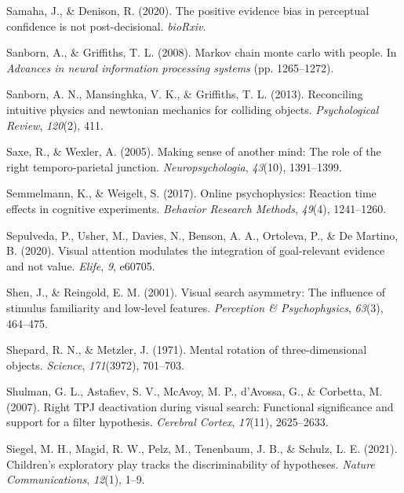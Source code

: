 \documentclass[12pt,twoside]{reedthesis}
\newenvironment{CSLReferences}%
  {}%
  {\par}
\begin{document}
\begin{CSLReferences}{1}{0}
\leavevmode\hypertarget{ref-samaha2020positive}{}%
Samaha, J., \& Denison, R. (2020). The positive evidence bias in perceptual confidence is not post-decisional. \emph{bioRxiv}.

\leavevmode\hypertarget{ref-sanborn2008markov}{}%
Sanborn, A., \& Griffiths, T. L. (2008). Markov chain monte carlo with people. In \emph{Advances in neural information processing systems} (pp. 1265--1272).

\leavevmode\hypertarget{ref-sanborn2013reconciling}{}%
Sanborn, A. N., Mansinghka, V. K., \& Griffiths, T. L. (2013). Reconciling intuitive physics and newtonian mechanics for colliding objects. \emph{Psychological Review}, \emph{120}(2), 411.

\leavevmode\hypertarget{ref-saxe2005making}{}%
Saxe, R., \& Wexler, A. (2005). Making sense of another mind: The role of the right temporo-parietal junction. \emph{Neuropsychologia}, \emph{43}(10), 1391--1399.

\leavevmode\hypertarget{ref-semmelmann2017online}{}%
Semmelmann, K., \& Weigelt, S. (2017). Online psychophysics: Reaction time effects in cognitive experiments. \emph{Behavior Research Methods}, \emph{49}(4), 1241--1260.

\leavevmode\hypertarget{ref-sepulveda2020visual}{}%
Sepulveda, P., Usher, M., Davies, N., Benson, A. A., Ortoleva, P., \& De Martino, B. (2020). Visual attention modulates the integration of goal-relevant evidence and not value. \emph{Elife}, \emph{9}, e60705.

\leavevmode\hypertarget{ref-shen2001visual}{}%
Shen, J., \& Reingold, E. M. (2001). Visual search asymmetry: The influence of stimulus familiarity and low-level features. \emph{Perception \& Psychophysics}, \emph{63}(3), 464--475.

\leavevmode\hypertarget{ref-shepard1971mental}{}%
Shepard, R. N., \& Metzler, J. (1971). Mental rotation of three-dimensional objects. \emph{Science}, \emph{171}(3972), 701--703.

\leavevmode\hypertarget{ref-shulman2007right}{}%
Shulman, G. L., Astafiev, S. V., McAvoy, M. P., d'Avossa, G., \& Corbetta, M. (2007). Right TPJ deactivation during visual search: Functional significance and support for a filter hypothesis. \emph{Cerebral Cortex}, \emph{17}(11), 2625--2633.

\leavevmode\hypertarget{ref-siegel2021children}{}%
Siegel, M. H., Magid, R. W., Pelz, M., Tenenbaum, J. B., \& Schulz, L. E. (2021). Children's exploratory play tracks the discriminability of hypotheses. \emph{Nature Communications}, \emph{12}(1), 1--9.


\end{CSLReferences}
\end{document}
